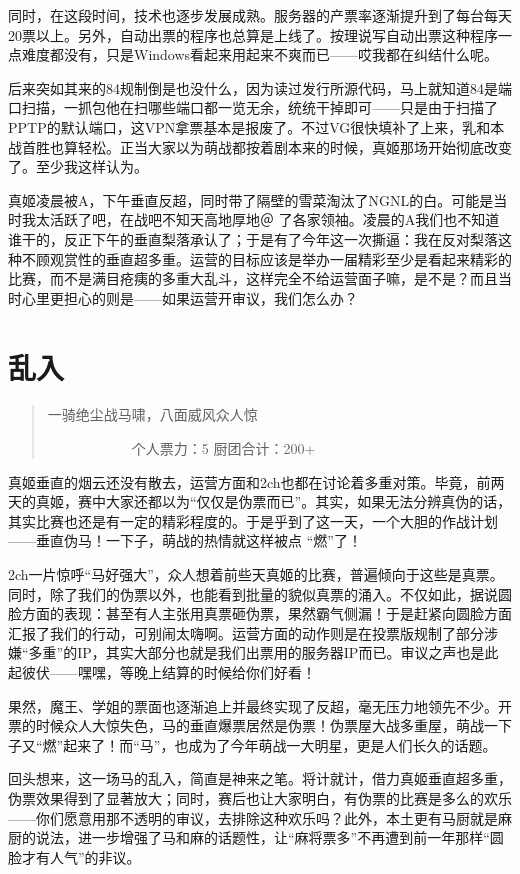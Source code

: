 同时，在这段时间，技术也逐步发展成熟。服务器的产票率逐渐提升到了每台每天20票以上。另外，自动出票的程序也总算是上线了。按理说写自动出票这种程序一点难度都没有，只是Windows看起来用起来不爽而已——哎我都在纠结什么呢。

后来突如其来的84规制倒是也没什么，因为读过发行所源代码，马上就知道84是端口扫描，一抓包他在扫哪些端口都一览无余，统统干掉即可——只是由于扫描了PPTP的默认端口，这VPN拿票基本是报废了。不过VG很快填补了上来，乳和本战首胜也算轻松。正当大家以为萌战都按着剧本来的时候，真姬那场开始彻底改变了。至少我这样认为。

真姬凌晨被A，下午垂直反超，同时带了隔壁的雪菜淘汰了NGNL的白。可能是当时我太活跃了吧，在战吧不知天高地厚地＠ 了各家领袖。凌晨的A我们也不知道谁干的，反正下午的垂直梨落承认了；于是有了今年这一次撕逼：我在反对梨落这种不顾观赏性的垂直超多重。运营的目标应该是举办一届精彩至少是看起来精彩的比赛，而不是满目疮痍的多重大乱斗，这样完全不给运营面子嘛，是不是？而且当时心里更担心的则是——如果运营开审议，我们怎么办？


\chapter{乱入}
\begin{quote}
一骑绝尘战马啸，八面威风众人惊

　　　　　　个人票力：5 厨团合计：200+
\end{quote}

真姬垂直的烟云还没有散去，运营方面和2ch也都在讨论着多重对策。毕竟，前两天的真姬，赛中大家还都以为“仅仅是伪票而已”。其实，如果无法分辨真伪的话，其实比赛也还是有一定的精彩程度的。于是乎到了这一天，一个大胆的作战计划——垂直伪马！一下子，萌战的热情就这样被点 “燃”了！

2ch一片惊呼“马好强大”，众人想着前些天真姬的比赛，普遍倾向于这些是真票。同时，除了我们的伪票以外，也能看到批量的貌似真票的涌入。不仅如此，据说圆脸方面的表现：甚至有人主张用真票砸伪票，果然霸气侧漏！于是赶紧向圆脸方面汇报了我们的行动，可别闹太嗨啊。运营方面的动作则是在投票版规制了部分涉嫌“多重”的IP，其实大部分也就是我们出票用的服务器IP而已。审议之声也是此起彼伏——嘿嘿，等晚上结算的时候给你们好看！

果然，魔王、学姐的票面也逐渐追上并最终实现了反超，毫无压力地领先不少。开票的时候众人大惊失色，马的垂直爆票居然是伪票！伪票屋大战多重屋，萌战一下子又“燃”起来了！而“马”，也成为了今年萌战一大明星，更是人们长久的话题。

回头想来，这一场马的乱入，简直是神来之笔。将计就计，借力真姬垂直超多重，伪票效果得到了显著放大；同时，赛后也让大家明白，有伪票的比赛是多么的欢乐——你们愿意用那不透明的审议，去排除这种欢乐吗？此外，本土更有马厨就是麻厨的说法，进一步增强了马和麻的话题性，让“麻将票多”不再遭到前一年那样“圆脸才有人气”的非议。


